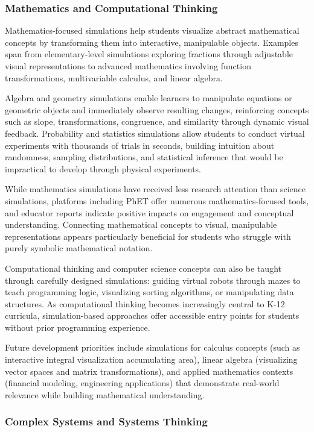 \subsubsection{Mathematics and Computational Thinking}

Mathematics-focused simulations help students visualize abstract mathematical concepts by transforming them into interactive, manipulable objects. Examples span from elementary-level simulations exploring fractions through adjustable visual representations to advanced mathematics involving function transformations, multivariable calculus, and linear algebra.

Algebra and geometry simulations enable learners to manipulate equations or geometric objects and immediately observe resulting changes, reinforcing concepts such as slope, transformations, congruence, and similarity through dynamic visual feedback. Probability and statistics simulations allow students to conduct virtual experiments with thousands of trials in seconds, building intuition about randomness, sampling distributions, and statistical inference that would be impractical to develop through physical experiments.

While mathematics simulations have received less research attention than science simulations, platforms including PhET offer numerous mathematics-focused tools, and educator reports indicate positive impacts on engagement and conceptual understanding. Connecting mathematical concepts to visual, manipulable representations appears particularly beneficial for students who struggle with purely symbolic mathematical notation.

Computational thinking and computer science concepts can also be taught through carefully designed simulations: guiding virtual robots through mazes to teach programming logic, visualizing sorting algorithms, or manipulating data structures. As computational thinking becomes increasingly central to K-12 curricula, simulation-based approaches offer accessible entry points for students without prior programming experience.

Future development priorities include simulations for calculus concepts (such as interactive integral visualization accumulating area), linear algebra (visualizing vector spaces and matrix transformations), and applied mathematics contexts (financial modeling, engineering applications) that demonstrate real-world relevance while building mathematical understanding.

\subsubsection{Complex Systems and Systems Thinking}

